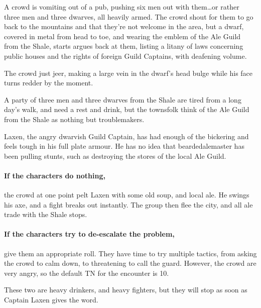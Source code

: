 \begin{multicols}{2}
\begin{boxtext}

	A crowd is vomiting out of a pub, pushing six men out with them\ldots or rather three men and three dwarves, all heavily armed.
	The crowd shout for them to go back to the mountains and that they're not welcome in the area, but a dwarf, covered in metal from head to toe, and wearing the emblem of the Ale Guild from the Shale, starts argues back at them, listing a litany of laws concerning public houses and the rights of foreign Guild Captains, with deafening volume.

	The crowd just jeer, making a large vein in the dwarf's head bulge while his face turns redder by the moment.

\end{boxtext}

A party of three men and three dwarves from the Shale are tired from a long day's walk, and need a rest and drink, but the townsfolk think of the Ale Guild from the Shale as nothing but troublemakers.

Laxen, the angry dwarvish Guild Captain, has had enough of the bickering and feels tough in his full plate armour.
He has no idea that \gls{beardedalemaster} has been pulling stunts, such as destroying the stores of the local Ale Guild.

\paragraph{If the characters do nothing,}
the crowd at one point pelt Laxen with some old soup, and local ale.
He swings his axe, and a fight breaks out instantly.
The group then flee the city, and all ale trade with the Shale stops.

\paragraph{If the characters try to de-escalate the problem,}
give them an appropriate roll.
They have time to try multiple tactics, from asking the crowd to calm down, to threatening to call the guard.
However, the crowd are very angry, so the default TN for the encounter is 10.



These two are heavy drinkers, and heavy fighters, but they will stop as soon as Captain Laxen gives the word.


\end{multicols}
